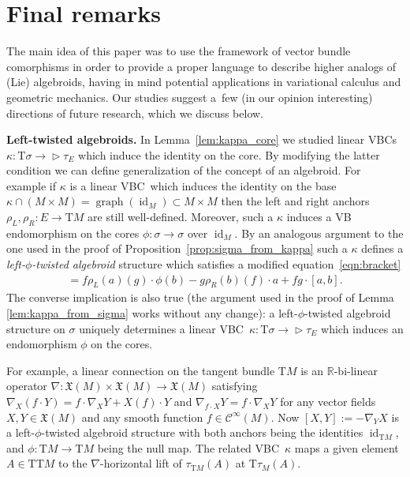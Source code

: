 \documentclass[10pt,a4paper]{amsart}
\newcommand{\ZM}{{VBC}} %
\newcommand{\Zakrzewski}{{vector bundle comorphism}}
\newcommand{\R}{\mathbb{R}}
\newcommand{\graf}{\operatorname{graph}}
\newcommand{\id}{\operatorname{id}}
\newcommand{\X}{\mathfrak{X}}
\newcommand{\ra}{\rightarrow}
\newcommand{\rhoL}{\rho_L} %
\newcommand{\rhoR}{\rho_R}
\newcommand{\T}{\mathrm{T}} %
\newcommand{\Cf}{\mathcal{C}^\infty}
\def\relto{\rightarrow\!\!\vartriangleright} %
\numberwithin{equation}{section}
\theoremstyle{definition}
\begin{document}
\section{Final remarks}\label{sec:final}
The main idea of this paper was to use the framework of \Zakrzewski s in order to provide a proper language to describe higher analogs of (Lie) algebroids, having in mind potential applications in variational calculus and geometric mechanics. Our studies suggest a~few (in our opinion interesting) directions of future research, which we discuss below.

{\bf Left-twisted algebroids.} In Lemma~\ref{lem:kappa_core} we studied linear \ZM s $\kappa\colon \T\sigma\relto \tau_E$ which induce the identity on the core. By modifying the latter condition we can define generalization of the concept of an algebroid. For example if $\kappa$ is a linear \ZM\ which induces the identity on the base $\kappa\cap(M\times M)=\graf(\id_M)\subset M\times M$ then the left and right anchors $\rhoL,\rhoR\colon E\ra \T M$ are still well-defined. Moreover, such a $\kappa$ induces a VB endomorphism on the cores $\phi\colon \sigma\ra \sigma$ over $\id_M$. By an analogous argument to the one used in the proof of Proposition~\ref{prop:sigma_from_kappa} such a $\kappa$ defines a \emph{left-$\phi$-twisted algebroid} structure which satisfies a modified equation~\eqref{eqn:bracket}
\begin{gather*}[f\cdot a,g\cdot b]=f\rhoL(a)(g)\cdot\phi(b)-g\rhoR(b)(f)\cdot a+fg\cdot[a,b].\end{gather*}
The converse implication is also true (the argument used in the proof of Lemma \ref{lem:kappa_from_sigma} works without any change): a left-$\phi$-twisted algebroid structure on $\sigma$ uniquely determines a linear \ZM\ $\kappa\colon \T\sigma\relto \tau_E$ which induces an endomorphism $\phi$ on the cores.

For example, a linear connection on the tangent bundle $\T M$ is an $\R$-bi-linear operator $\nabla\colon \X(M)\times\X(M)\ra \X(M)$ satisfying $\nabla_X(f\cdot Y)=f\cdot\nabla_XY+X(f)\cdot Y$ and $\nabla_{f\cdot X}Y=f\cdot\nabla_X Y$ for any vector fields $X,Y\in\X(M)$ and any smooth function $f\in\Cf(M)$. Now $[X,Y]:=-\nabla_YX$ is a left-$\phi$-twisted algebroid structure with both anchors being the identities $\id_{\T M}${,} and $\phi\colon \T M\ra\T M$ being the null map. The related \ZM\ $\kappa$ maps a given element $A\in \T\T M$ to the $\nabla$-horizontal lift of $\tau_{\T M}(A)$ at $\T\tau_M(A)$.
\end{document}
